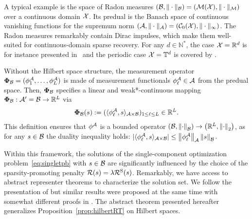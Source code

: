 \documentclass[12pt]{article}
\begin{document}
    A typical example is the space of Radon measures $(\mathcal{B}, \|\cdot \|_{\mathcal{B}}) = ({\mathcal{M}}({\mathcal{X}}), \|\cdot \|_{\mathcal{M}})$ over a continuous domain $\mathcal{X}$. Its predual is the Banach space of continuous vanishing functions for the supremum norm $(\mathcal{A}, \|\cdot \|_{\mathcal{A}}) =({\mathcal{C}}_0({\mathcal{X}}), \| \cdot \|_{\infty})$. The Radon measures remarkably contain Dirac impulses, which make them well-suited for continuous-domain sparse recovery. For any $d\in\mathbb{N}^*$, the case $\mathcal{X}=\mathbb{R}^d$ is for instance presented in~\cite{unser2017splines,Unser2020} and the periodic case $\mathcal{X}=\mathbb{T}^d$ is covered by \cite{fageot2020tv}.

    Without the Hilbert space structure, the measurement operator ${\bm{\Phi}_\mathcal{B}}= (\phi^\mathcal{A}_1, \ldots, \phi^\mathcal{A}_L)$ is made of measurement functionals $\phi^\mathcal{A}_\ell \in \mathcal{A}$ from the predual space. Then, ${\bm{\Phi}_\mathcal{B}}$ specifies a linear and weak*-continuous mapping ${\bm{\Phi}_\mathcal{B}}: \mathcal{A}' =\mathcal{B} \rightarrow \mathbb{R}^L$ via 
    \begin{equation}
        \label{eq:phi-banach}
        {\bm{\Phi}_\mathcal{B}} (s) := (\langle \phi^\mathcal{A}_\ell, s \rangle_{\mathcal{A}\times\mathcal{B}})_{1\leq \ell \leq L} \in \mathbb{R}^L.
    \end{equation}
    This definition ensures that $\phi^\mathcal{A}$ is a bounded operator $\left(\mathcal{B}, \left\lVert\cdot\right\rVert_{\mathcal{B}} \right) \to \left(\mathbb{R}^L, \left\lVert\cdot\right\rVert_2\right)$, as for any $s\in\mathcal{B}$ the duality inequality holds: $\lvert \langle \phi^\mathcal{A}_\ell, s \rangle_{\mathcal{A}\times\mathcal{B}} \rvert \leq \left\lVert\phi^\mathcal{A}_\ell\right\rVert_{\mathcal{A}} \left\lVert s\right\rVert_{\mathcal{B}}$.

    Within this framework, the solutions of the single-component optimization problem~\eqref{eq:singletpb} with $s\in\mathcal{B}$  are significantly influenced by the choice of the sparsity-promoting penalty $\mathcal{R}(s) = \lambda \mathcal{R}^\mathrm{S}(s)$. Remarkably, we have access to abstract representer theorems to characterize the solution set. We follow the presentation of \cite{boyer2019representer} but similar results were proposed at the same time with somewhat different proofs in \cite{bredies2020sparsity}. The abstract theorem presented hereafter generalizes Proposition~\ref{prop:hilbertRT} on Hilbert spaces.
    
\end{document}
